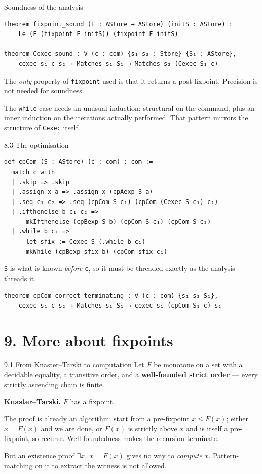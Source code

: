 \documentclass[aspectratio=169,10pt]{beamer}
\newcommand{\code}[1]{\texttt{\small #1}}
\begin{document}
\begin{frame}[fragile]{Soundness of the analysis}
\begin{lstlisting}
theorem fixpoint_sound (F : AStore → AStore) (initS : AStore) :
    Le (F (fixpoint F initS)) (fixpoint F initS)

theorem Cexec_sound : ∀ (c : com) {s₁ s₂ : Store} {S₁ : AStore},
    cexec s₁ c s₂ → Matches s₁ S₁ → Matches s₂ (Cexec S₁ c)
\end{lstlisting}
The \emph{only} property of \code{fixpoint} used is that it returns a
post-fixpoint.  Precision is not needed for soundness.
\medskip

The \code{while} case needs an unusual induction: structural on the command,
plus an inner induction on the iterations actually performed.  That pattern
mirrors the structure of \code{Cexec} itself.
\end{frame}

\begin{frame}[fragile]{8.3 The optimisation}
\begin{lstlisting}
def cpCom (S : AStore) (c : com) : com :=
  match c with
  | .skip => .skip
  | .assign x a => .assign x (cpAexp S a)
  | .seq c₁ c₂ => .seq (cpCom S c₁) (cpCom (Cexec S c₁) c₂)
  | .ifthenelse b c₁ c₂ =>
      mkIfthenelse (cpBexp S b) (cpCom S c₁) (cpCom S c₂)
  | .while b c₁ =>
      let sfix := Cexec S (.while b c₁)
      mkWhile (cpBexp sfix b) (cpCom sfix c₁)
\end{lstlisting}
\code{S} is what is known \emph{before} \code{c}, so it must be threaded
exactly as the analysis threads it.
\begin{lstlisting}
theorem cpCom_correct_terminating : ∀ (c : com) {s₁ s₂ S₁},
    cexec s₁ c s₂ → Matches s₁ S₁ → cexec s₁ (cpCom S₁ c) s₂
\end{lstlisting}
\end{frame}

\section{9. More about fixpoints}

\begin{frame}{9.1 From Knaster--Tarski to computation}
Let $F$ be monotone on a set with a decidable equality, a transitive order,
and a \textbf{well-founded strict order} --- every strictly ascending chain
is finite.
\medskip

\textbf{Knaster--Tarski.}  $F$ has a fixpoint.
\medskip

The proof is already an algorithm: start from a pre-fixpoint $x \le F(x)$;
either $x = F(x)$ and we are done, or $F(x)$ is strictly above $x$ and is
itself a pre-fixpoint, so recurse.  Well-foundedness makes the recursion
terminate.
\medskip
\pause

But an existence proof $\exists x,\ x = F(x)$ gives no way to \emph{compute}
$x$.  Pattern-matching on it to extract the witness is not allowed.
\end{frame}
\end{document}
